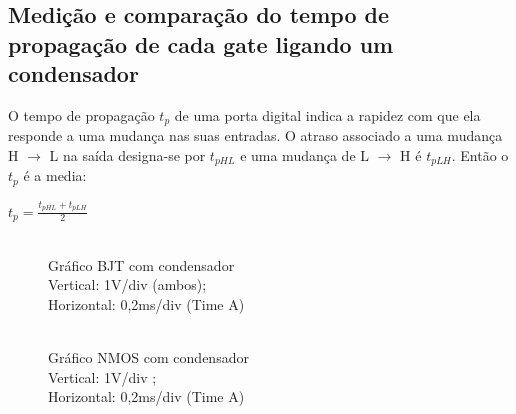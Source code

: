 \documentclass[pdftex,12pt,a4paper]{report}
\begin{document}
\subsection{Medição e comparação do tempo de propagação de cada gate ligando um condensador}

O tempo de propagação $t_p$ de uma porta digital indica a rapidez com que ela responde a uma mudança nas suas entradas. O atraso associado a uma mudança H $\rightarrow$ L na saída designa-se por $t_{pHL}$ e uma mudança de L $\rightarrow$ H é $t_{pLH}$. Então o $t_p$ é a media:

\centerline{$t_p = \frac{t_{pHL}+t_{pLH}}{2}$}

\begin{figure}[!htb]
  \centerline{}
  \caption{\\Gráfico BJT com condensador\\Vertical: 1V/div (ambos); \\Horizontal: 0,2ms/div (Time A)}\label{bjt}
\endminipage\hfill
{}
  \centerline{}
  \caption{\\Gráfico NMOS com condensador \\Vertical: 1V/div ; \\Horizontal: 0,2ms/div (Time A) }\label{fig:nmos}
\endminipage\hfill
\end{figure}
\end{document}
